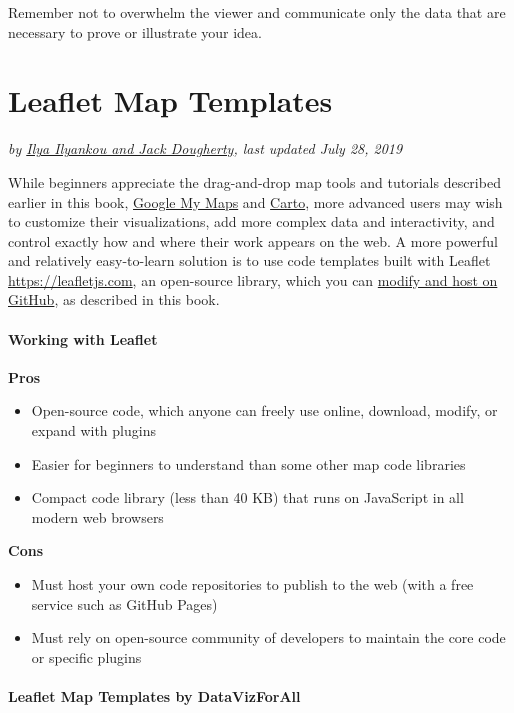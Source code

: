 \documentclass[
  english,
]{book}
\providecommand{\tightlist}{%
  \setlength{\itemsep}{0pt}\setlength{\parskip}{0pt}}
\begin{document}
Remember not to overwhelm the viewer and communicate only the data that are necessary to prove or illustrate your idea.

\hypertarget{leaflet}{%
\chapter{Leaflet Map Templates}\label{leaflet}}

\emph{by \href{authors}{Ilya Ilyankou and Jack Dougherty}, last updated July 28, 2019}

While beginners appreciate the drag-and-drop map tools and tutorials described earlier in this book, \href{mymaps}{Google My Maps} and \href{carto}{Carto}, more advanced users may wish to customize their visualizations, add more complex data and interactivity, and control exactly how and where their work appears on the web. A more powerful and relatively easy-to-learn solution is to use code templates built with Leaflet \url{https://leafletjs.com}, an open-source library, which you can \href{github}{modify and host on GitHub}, as described in this book.

\hypertarget{working-with-leaflet}{%
\subsubsection{Working with Leaflet}\label{working-with-leaflet}}

\textbf{Pros}

\begin{itemize}
\tightlist
\item
  Open-source code, which anyone can freely use online, download, modify, or expand with plugins
\item
  Easier for beginners to understand than some other map code libraries
\item
  Compact code library (less than 40 KB) that runs on JavaScript in all modern web browsers
\end{itemize}

\textbf{Cons}

\begin{itemize}
\tightlist
\item
  Must host your own code repositories to publish to the web (with a free service such as GitHub Pages)
\item
  Must rely on open-source community of developers to maintain the core code or specific plugins
\end{itemize}

\hypertarget{leaflet-map-templates-by-datavizforall}{%
\subsubsection{Leaflet Map Templates by DataVizForAll}\label{leaflet-map-templates-by-datavizforall}}
\end{document}
